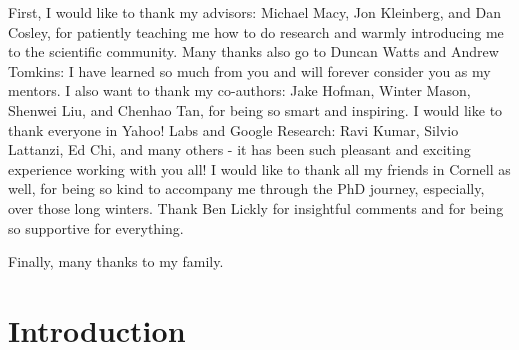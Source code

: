 \documentclass[phd,tocprelim]{cornell}
\begin{document}
\begin{acknowledgements}
First, I would like to thank my advisors: Michael Macy, Jon Kleinberg, and Dan Cosley, for patiently teaching me how to do research and warmly introducing me to the scientific community. Many thanks also go to Duncan Watts and Andrew Tomkins: I have learned so much from you and will forever consider you as my mentors. I also want to thank my co-authors: Jake Hofman, Winter Mason, Shenwei Liu, and Chenhao Tan, for being so smart and inspiring. I would like to thank everyone in Yahoo! Labs and Google Research: Ravi Kumar, Silvio Lattanzi, Ed Chi, and many others - it has been such pleasant and exciting experience working with you all! I would like to thank all my friends in Cornell as well, for being so kind to accompany me through the PhD journey, especially, over those long winters. Thank Ben Lickly for insightful comments and for being so supportive for everything. 

Finally, many thanks to my family. 



\end{acknowledgements}

\contentspage
\tablelistpage
\figurelistpage

\normalspacing \setcounter{page}{1} 
\pagestyle{cornell} \addtolength{\parskip}{0.5\baselineskip}


\chapter{Introduction}
\end{document}
